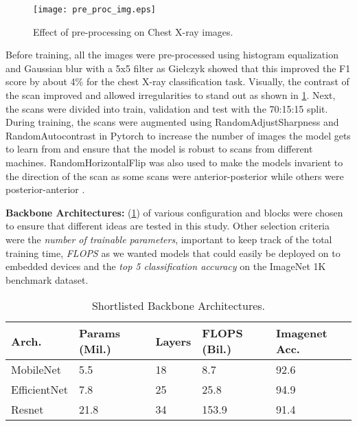 \documentclass[10pt,twocolumn,letterpaper]{article}
\begin{document}
\begin{figure}[t]
  \centering
  \texttt{[image: pre\_proc\_img.eps]}  
   \caption{Effect of pre-processing on Chest X-ray images.}
   \label{fig:pre_proc_img}
\end{figure}

Before training, all the images were pre-processed using histogram equalization and Gaussian blur 
with a 5x5 filter as Giełczyk \etal \cite{gielczyk2022pre} showed that this improved the 
F1 score by about 4\% for the chest X-ray classification task. Visually, the contrast of the scan improved 
and allowed irregularities to stand out as shown in \cref{fig:pre_proc_img}. Next, the 
scans were divided into train, validation and test with the 70:15:15 split. 
During training, the scans were augmented using RandomAdjustSharpness and 
RandomAutocontrast \cite{nanni2021comparison} in Pytorch \cite{transforms} to increase the number of images the 
model gets to learn from and ensure that the model is robust to scans from different machines.
RandomHorizontalFlip was also used to make the models invarient to the direction of the scan as 
some scans were anterior-posterior while others were posterior-anterior \cite{botev2022regularising}.

\textbf{Backbone Architectures:} (\cref{tab:selArch}) of various configuration and blocks were chosen 
to ensure that different ideas are tested in this study. 
Other selection criteria were the \textit{number of trainable parameters}, important to keep track of 
the total training time, \textit{FLOPS} as we wanted models that could easily be 
deployed on to embedded devices and the \textit{top 5 classification accuracy} on the ImageNet 
1K benchmark dataset.

\begin{table}
  \centering
  \begin{tabular}{p{1.7cm}|p{1cm}|p{1cm}|p{1cm}|p{1cm}}
  \toprule
  Arch. & Params (Mil.) & Layers & FLOPS (Bil.) & Imagenet Acc.\\
  \midrule
  MobileNet & 5.5 & 18 & 8.7 & 92.6\\
  \midrule
  EfficientNet & 7.8 & 25 & 25.8 & 94.9\\
  \midrule
  Resnet & 21.8 & 34 & 153.9 & 91.4\\
  \bottomrule
  \end{tabular}
  \caption{Shortlisted Backbone Architectures.}
  \label{tab:selArch}
\end{table}
\end{document}
